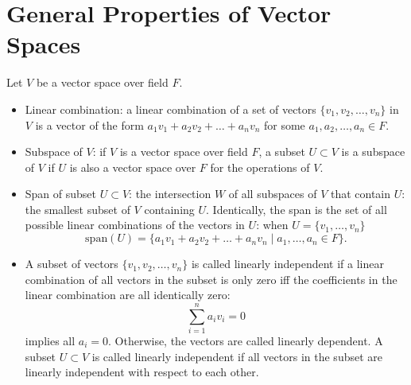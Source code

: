 \section{General Properties of Vector Spaces}
Let $V$ be a vector space over field $F$.
\begin{itemize}
    \item Linear combination: a linear combination of a set of vectors $\{v_1, v_2,\dots,v_n\}$ in $V$ is a vector of the form $a_1v_1+a_2v_2+\dots+a_n v_n$ for some $a_1, a_2, \dots, a_n\in F$.
    \item Subspace of $V$: if $V$ is a vector space over field $F$, a subset $U\subset V$ is a subspace of $V$ if $U$ is also a vector space over $F$ for the operations of $V$.
    \item Span of subset $U\subset V$: the intersection $W$ of all subspaces of $V$ that contain $U$: the smallest subset of $V$ containing $U$. Identically, the span is the set of all possible linear combinations of the vectors in $U$: when $U=\{v_1, \dots, v_n\}$
    \[
        \text{span}(U) = \{a_1v_1 + a_2v_2 + \dots + a_n v_n \;|\; a_1, \dots, a_n \in F\}.
    \]
    \item A subset of vectors $\{v_1, v_2,\dots, v_n\}$ is called linearly independent if a linear combination of all vectors in the subset is only zero iff the coefficients in the linear combination are all identically zero:
    \[
        \sum_{i=1}^n a_i v_i = 0
    \]
    implies all $a_i = 0$. Otherwise, the vectors are called linearly dependent. A subset $U\subset V$ is called linearly independent if all vectors in the subset are linearly independent with respect to each other.
    

\end{itemize}
